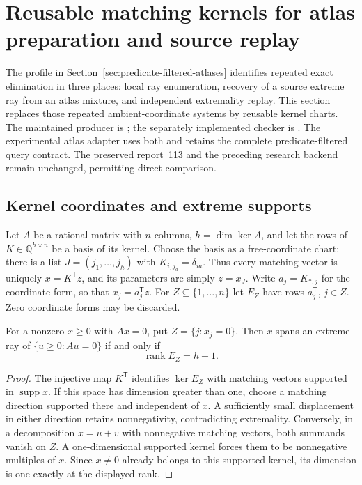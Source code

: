 \section{Reusable matching kernels for atlas preparation and source replay}
\label{sec:reusable-source-kernels}

The profile in Section~\ref{sec:predicate-filtered-atlases} identifies repeated
exact elimination in three places: local ray enumeration, recovery of a source
extreme ray from an atlas mixture, and independent extremality replay.  This
section replaces those repeated ambient-coordinate systems by reusable
kernel charts.  The maintained producer is ;
the separately implemented checker is
.  The experimental atlas adapter
 uses both and retains the
complete predicate-filtered query contract.  The preserved report~113 and
the preceding research backend remain unchanged, permitting direct comparison.

\subsection{Kernel coordinates and extreme supports}

Let $A$ be a rational matrix with $n$ columns, $h=\dim\ker A$, and let the rows
of $K\in\mathbb Q^{h\times n}$ be a basis of its kernel.  Choose the basis as
a free-coordinate chart: there is a list $J=(j_1,\ldots,j_h)$ with
$K_{i,j_a}=\delta_{ia}$.  Thus every matching vector is uniquely
$x=K^{\mathsf T}z$, and its parameters are simply $z=x_J$.  Write
$a_j=K_{*,j}$ for the coordinate form, so that $x_j=a_j^{\mathsf T}z$.
For $Z\subseteq\{1,\ldots,n\}$ let $E_Z$ have rows $a_j^{\mathsf T}$,
$j\in Z$.  Zero coordinate forms may be discarded.

\begin{proposition}
For a nonzero $x\geq0$ with $Ax=0$, put $Z=\{j:x_j=0\}$.  Then $x$ spans
an extreme ray of $\{u\geq0:Au=0\}$ if and only if
\[
 \operatorname{rank}E_Z=h-1.
\]
\end{proposition}
\begin{proof}
The injective map $K^{\mathsf T}$ identifies $\ker E_Z$ with matching vectors
supported in $\operatorname{supp}x$.  If this space has dimension greater
than one, choose a matching direction supported there and independent of
$x$.  A sufficiently small displacement in either direction retains
nonnegativity, contradicting extremality.  Conversely, in a decomposition
$x=u+v$ with nonnegative matching vectors, both summands vanish on $Z$.
A one-dimensional supported kernel forces them to be nonnegative multiples
of $x$.  Since $x\ne0$ already belongs to this supported kernel, its dimension
is one exactly at the displayed rank.
\end{proof}

